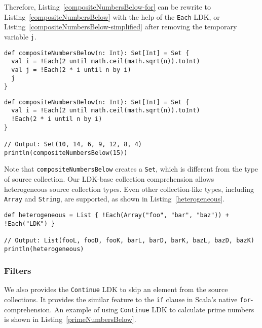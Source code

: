 Therefore, Listing~\ref{compositeNumbersBelow-for} can be rewrite to Listing~\ref{compositeNumbersBelow} with the help of the \lstinline{Each} LDK, or Listing~\ref{compositeNumbersBelow-simplified} after removing the temporary variable \lstinline{j}.

\begin{lstlisting}[caption={Calculating all composite numbers below $n$ with \lstinline{Each} LDK},label={compositeNumbersBelow}]
def compositeNumbersBelow(n: Int): Set[Int] = Set {
  val i = !Each(2 until math.ceil(math.sqrt(n)).toInt)
  val j = !Each(2 * i until n by i)
  j
}
\end{lstlisting}


\begin{lstlisting}[caption={Calculating all composite numbers below $n$ with \lstinline{Each} LDK, the simplicied version},label={compositeNumbersBelow-simplified}]
def compositeNumbersBelow(n: Int): Set[Int] = Set {
  val i = !Each(2 until math.ceil(math.sqrt(n)).toInt)
  !Each(2 * i until n by i)
}

// Output: Set(10, 14, 6, 9, 12, 8, 4)
println(compositeNumbersBelow(15))
\end{lstlisting}

Note that \lstinline{compositeNumbersBelow} creates a \lstinline{Set}, which is different from the type of source collection. Our LDK-base collection comprehension allows heterogeneous source collection types. Even other collection-like types, including \lstinline{Array} and \lstinline{String}, are supported, as shown in Listing~\ref{heterogeneous}.

\begin{lstlisting}[caption={LDK-based heterogeneous collection comprehension based on \lstinline{Array} and \lstinline{String}},label={heterogeneous}]
def heterogeneous = List { !Each(Array("foo", "bar", "baz")) + !Each("LDK") }

// Output: List(fooL, fooD, fooK, barL, barD, barK, bazL, bazD, bazK)
println(heterogeneous)
\end{lstlisting}
\subsubsection{Filters}

We also provides the \lstinline{Continue} LDK to skip an element from the source collections. It provides the similar feature to the \lstinline{if} clause in Scala's native \lstinline{for}-comprehension. An example of using \lstinline{Continue} LDK to calculate prime numbers is shown in Listing~\ref{primeNumbersBelow}.

